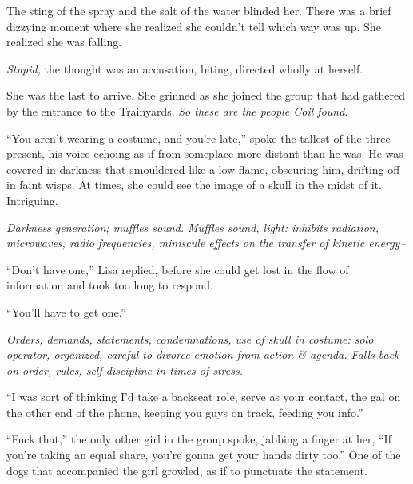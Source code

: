 The sting of the spray and the salt of the water blinded her.  There was a brief dizzying moment where she realized she couldn't tell which way was up.  She realized she was falling.



\emph{Stupid,} the thought was an accusation, biting, directed wholly at herself.



\sectionbreak



She was the last to arrive.  She grinned as she joined the group that had gathered by the entrance to the Trainyards.  \emph{So these are the people Coil found}.



``You aren't wearing a costume, and you're late,'' spoke the tallest of the three present, his voice echoing as if from someplace more distant than he was.  He was covered in darkness that smouldered like a low flame, obscuring him, drifting off in faint wisps.  At times, she could see the image of a skull in the midst of it.  Intriguing.



\emph{Darkness generation; muffles sound. Muffles sound, light: inhibits radiation, microwaves, radio frequencies, miniscule effects on the transfer of kinetic energy--}



``Don't have one,'' Lisa replied, before she could get lost in the flow of information and took too long to respond.



``You'll have to get one.''



\emph{Orders, demands, statements, condemnations, use of skull in costume: solo operator, organized, careful to divorce emotion from action \& agenda.  Falls back on order, rules, self discipline in times of stress.}



``I was sort of thinking I'd take a backseat role, serve as your contact, the gal on the other end of the phone, keeping you guys on track, feeding you info.''



``Fuck that,'' the only other girl in the group spoke, jabbing a finger at her, ``If you're taking an equal share, you're gonna get your hands dirty too.''  One of the dogs that accompanied the girl growled, as if to punctuate the statement.



